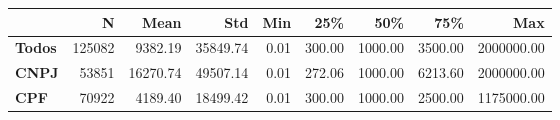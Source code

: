\begin{tabular}{lrrrrrrrr}
\toprule
{} &      N &     Mean &      Std &  Min &    25\% &     50\% &     75\% &        Max \\
\midrule
\textbf{Todos} & 125082 &  9382.19 & 35849.74 & 0.01 & 300.00 & 1000.00 & 3500.00 & 2000000.00 \\
\textbf{CNPJ } &  53851 & 16270.74 & 49507.14 & 0.01 & 272.06 & 1000.00 & 6213.60 & 2000000.00 \\
\textbf{CPF  } &  70922 &  4189.40 & 18499.42 & 0.01 & 300.00 & 1000.00 & 2500.00 & 1175000.00 \\
\bottomrule
\end{tabular}
